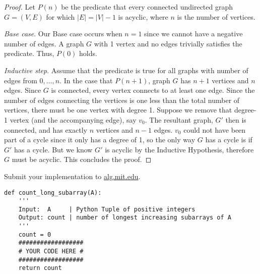 \documentclass[12pt,twoside]{article}
\begin{document}
\begin{problems}
\newpage
\problem  %
\begin{proof}
Let \(P(n)\) be the predicate that every connected undirected graph \(G=(V,E)\) for which \(|E|=|V|-1\) is acyclic, where \(n\) is the number of vertices.

\textit{Base case}. Our Base case occurs when \(n=1\) since we cannot have a negative number of edges. A graph \(G\) with 1 vertex and no edges trivially satisfies the predicate. Thus, \(P(0)\) holds.

\textit{Inductive step}. Assume that the predicate is true for all graphs with number of edges from \(0,\ldots,n\). In the case that \(P(n+1)\), graph \(G\) has \(n+1\) vertices and \(n\) edges. Since \(G\) is connected, every vertex connects to at least one edge. Since the number of edges connecting the vertices is one less than the total number of vertices, there must be one vertex with degree 1. Suppose we remove that degree-1 vertex (and the accompanying edge), say \(v_0\). The resultant graph, \(G'\) then is connected, and has exactly \(n\) vertices and \(n-1\) edges. \(v_0\) could not have been part of a cycle since it only has a degree of 1, so the only way \(G\) has a cycle is if \(G'\) has a cycle. But we know \(G'\) is acyclic by the Inductive Hypothesis, therefore \(G\) must be acyclic. This concludes the proof.
\end{proof}

\vfill
\problem  %
Submit your implementation to {\small\url{alg.mit.edu}}.

\begin{lstlisting}
def count_long_subarray(A):
    '''
    Input:  A     | Python Tuple of positive integers
    Output: count | number of longest increasing subarrays of A
    '''
    count = 0
    ##################
    # YOUR CODE HERE #
    ##################
    return count
\end{lstlisting}

\end{problems}
\end{document}
